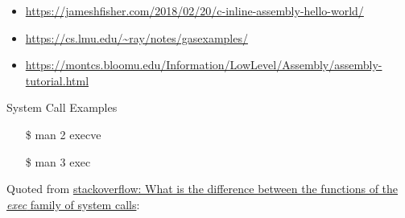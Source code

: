 \begin{itemize}
\item \url{https://jameshfisher.com/2018/02/20/c-inline-assembly-hello-world/}
\item \url{https://cs.lmu.edu/~ray/notes/gasexamples/}
\item \url{https://montcs.bloomu.edu/Information/LowLevel/Assembly/assembly-tutorial.html}
\end{itemize}

\begin{frame}{System Call Examples}
  \begin{iblock}{}
    \begin{center}
    \end{center}
  \end{iblock}
\end{frame}

\begin{frame}
  \begin{iblock}{}
    \centering
  \end{iblock}\ttfamily
  \begin{itemize}
  \item[\$] man 2 execve
  \item[\$] man 3 exec
  \end{itemize}
\end{frame}

Quoted from
\href{https://stackoverflow.com/questions/20823371/what-is-the-difference-between-the-functions-of-the-exec-family-of-system-calls}{
  stackoverflow: What is the difference between the functions of the \emph{exec} family of system calls}:

